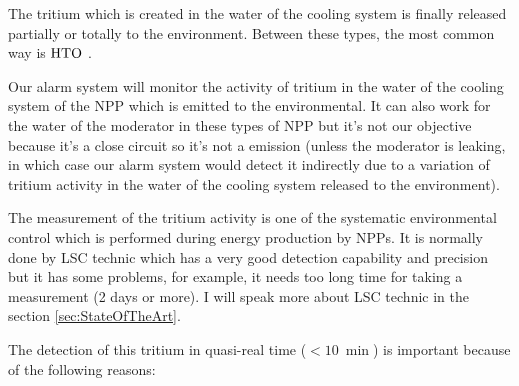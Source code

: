 The tritium which is created in the water of the cooling system is finally released partially or totally to the environment. Between these types, the most common way is $\ce{HTO}$ \cite{CommonEmissionTritium}.

Our alarm system will monitor the activity of tritium in the water of the cooling system of the NPP which is emitted to the environmental. It can also work for the water of the moderator in these types of NPP but it's not our objective because it's a close circuit so it's not a emission (unless the moderator is leaking, in which case our alarm system would detect it indirectly due to a variation of tritium activity in the water of the cooling system released to the environment).

The measurement of the tritium activity is one of the systematic environmental control which is performed during energy production by NPPs. It is normally done by LSC technic which has a very good detection capability and precision but it has some problems, for example, it needs too long time for taking a measurement (2 days or more). I will speak more about LSC technic in the section \ref{sec:StateOfTheArt}.

The detection of this tritium in quasi-real time ($<10~\min$) is important because of the following reasons:

